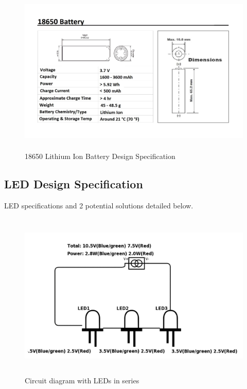 \documentclass[12pt]{article}
\begin{document}
{{{{			\begin{figure}[!htb]
				\centering
				\includegraphics[width = 140mm, height = 80mm]{assets/18650_Battery.jpg}
				\caption{18650 Lithium Ion Battery Design Specification \label{overflow}}
			\end{figure}
		
		\subsection{LED Design Specification}
		LED specifications and 2 potential solutions detailed below.
			\begin{figure}[!htb]
				\centering
				\includegraphics[height = 80mm]{assets/SeriesLED.jpg}
				\caption{Circuit diagram with LEDs in series \label{overflow}}
			\end{figure}
		
}}}}
\end{document}
